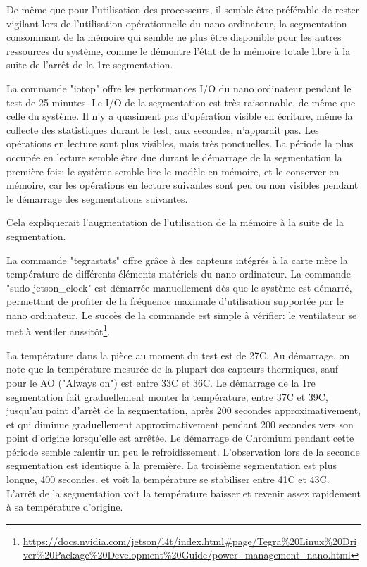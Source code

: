 \par De même que pour l'utilisation des processeurs, il semble être préférable de rester vigilant lors de l'utilisation opérationnelle du nano ordinateur, la segmentation consommant de la mémoire qui semble ne plus être disponible pour les autres ressources du système, comme le démontre l'état de la mémoire totale libre à la suite de l'arrêt de la 1re segmentation. 
\par La commande "iotop" offre les performances I/O du nano ordinateur pendant le test de 25 minutes. Le I/O de la segmentation est très raisonnable, de même que celle du système. Il n'y a quasiment pas d'opération visible en écriture, même la collecte des statistiques durant le test, aux secondes, n'apparait pas. Les opérations en lecture sont plus visibles, mais très ponctuelles. La période la plus occupée en lecture semble être due durant le démarrage de la segmentation la première fois: le système semble lire le modèle en mémoire, et le conserver en mémoire, car les opérations en lecture suivantes sont peu ou non visibles pendant le démarrage des segmentations suivantes.
\par Cela expliquerait l'augmentation de l'utilisation de la mémoire à la suite de la segmentation. 
\par La commande "tegrastats" offre grâce à des capteurs intégrés à la carte mère la température de différents éléments matériels du nano ordinateur. La commande "sudo jetson\_clock" est démarrée manuellement dès que le système est démarré, permettant de profiter de la fréquence maximale d'utilisation supportée par le nano ordinateur. Le  succès de la commande est simple à vérifier: le ventilateur se met à ventiler aussitôt\footnote{\url{https://docs.nvidia.com/jetson/l4t/index.html#page/Tegra\%20Linux\%20Driver\%20Package\%20Development\%20Guide/power_management_nano.html}}.
\par La température dans la pièce au moment du test est de 27C. Au démarrage, on note que la température mesurée de la plupart des capteurs thermiques, sauf pour le AO ("Always on") est entre 33C et 36C. Le démarrage de la 1re segmentation fait graduellement monter la température, entre 37C et 39C, jusqu'au point d'arrêt de la segmentation, après 200 secondes approximativement, et qui diminue graduellement approximativement pendant 200 secondes vers son point d'origine lorsqu'elle est arrêtée. Le démarrage de Chromium pendant cette période semble ralentir un peu le refroidissement. L'observation lors de la seconde segmentation est identique à la première. La troisième segmentation est plus longue, 400 secondes, et voit la température se stabiliser entre 41C et 43C. L'arrêt de la segmentation voit la température baisser et revenir assez rapidement à sa température d'origine. 
